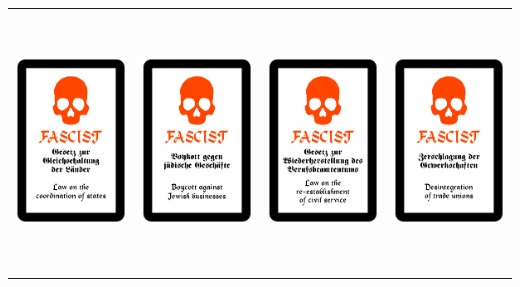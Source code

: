 \documentclass[12pt,a4paper,spanish]{article}
\begin{document}
\begin{table}
\begin{tabular}{|c|c|c|c|}
			\midrule
			\includegraphics[height=6.85cm]{./Drawings/fascist5.pdf} &
			\includegraphics[height=6.85cm]{./Drawings/fascist6.pdf} &
			\includegraphics[height=6.85cm]{./Drawings/fascist7.pdf} &
			\includegraphics[height=6.85cm]{./Drawings/fascist8.pdf} \\

\end{tabular}
\end{table}
\end{document}
